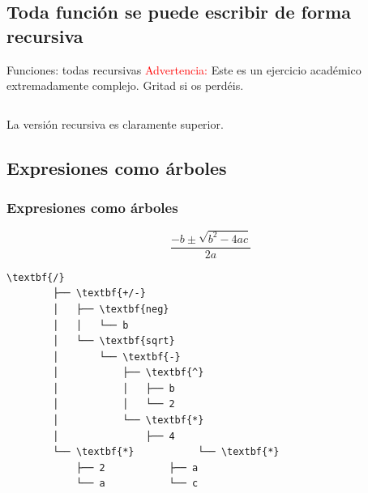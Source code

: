 \documentclass[xcolor=x11names,compress]{beamer}
\renewcommand{\(}{\begin{columns}}
\renewcommand{\)}{\end{columns}}
\newcommand{\<}[1]{\begin{column}{#1}}
\renewcommand{\>}{\end{column}}
\begin{document}
\subsection{Toda función se puede escribir de forma recursiva}
\begin{frame}{Funciones: todas recursivas}
    \textcolor{red}{Advertencia:} Este es un ejercicio académico \pause extremadamente complejo\pause. Gritad si os perdéis. \pause
    \begin{columns}
        \begin{column}{.30\linewidth}
        \begin{block}
            \codeLengthIteration
        \end{block}
        \end{column}
        \begin{column}{.65\linewidth}
        \begin{block}
            \codeLengthRecursion
        \end{block}
        \end{column}
    \end{columns} \pause
    La versión recursiva es claramente superior.
\end{frame}


\subsection{Expresiones como árboles}
\begin{frame}[fragile]
    \frametitle{Expresiones como árboles}
    $$\frac{-b\pm\sqrt{b^2-4ac}}{2a}$$
    
    \pause

\begin{Verbatim}[commandchars=\\\{\},codes={\catcode`$=3\catcode`_=8}]
        \textbf{/}
        ├── \textbf{+/-}
        │   ├── \textbf{neg}
        │   │   └── b
        │   └── \textbf{sqrt}
        │       └── \textbf{-}
        │           ├── \textbf{^}
        │           │   ├── b
        │           │   └── 2
        │           └── \textbf{*}
        │               ├── 4
        └── \textbf{*}           └── \textbf{*}
            ├── 2           ├── a
            └── a           └── c
\end{Verbatim}
\end{frame}
\end{document}
